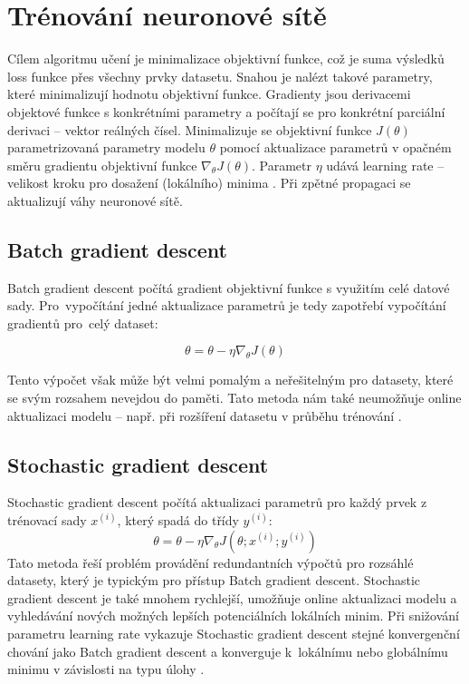 \section{Trénování neuronové sítě}
Cílem algoritmu učení je minimalizace objektivní funkce, což je suma výsledků loss funkce přes všechny prvky datasetu. Snahou je nalézt takové parametry, které minimalizují hodnotu objektivní funkce. Gradienty jsou derivacemi objektové funkce s konkrétními parametry a počítají se pro konkrétní parciální derivaci -- vektor reálných čísel. Minimalizuje se objektivní funkce $J(\theta)$ parametrizovaná parametry modelu $\theta$ pomocí aktualizace parametrů v opačném směru gradientu objektivní funkce $\nabla_{\theta}J(\theta)$. Parametr $\eta$ udává learning rate -- velikost kroku pro dosažení (lokálního) minima \cite{GradientDescent}. Při zpětné propagaci se aktualizují váhy neuronové sítě.

\subsection{Batch gradient descent}
Batch gradient descent počítá gradient objektivní funkce s využitím celé datové sady. Pro~vypočítání jedné aktualizace parametrů je tedy zapotřebí vypočítání gradientů pro~celý dataset: 

  \begin{equation} 
    \theta = \theta - \eta\nabla_{\theta}J(\theta)
    \end{equation} 

Tento výpočet však může být velmi pomalým a neřešitelným pro datasety, které se svým rozsahem nevejdou do paměti. Tato metoda nám také neumožňuje online aktualizaci modelu -- např. při rozšíření datasetu v průběhu trénování \cite{GradientDescent}.

\subsection{Stochastic gradient descent}
Stochastic gradient descent počítá aktualizaci parametrů pro každý prvek z trénovací sady $x^{(i)}$, který spadá do třídy $y^{(i)}$:
  \begin{equation} 
    \theta = \theta - \eta\nabla_{\theta}J(\theta;x^{(i)};y^{(i)})
    \end{equation} 
Tato metoda řeší problém provádění redundantních výpočtů pro rozsáhlé datasety, který je typickým pro přístup Batch gradient descent. Stochastic gradient descent je také mnohem rychlejší, umožňuje online aktualizaci modelu a vyhledávání nových možných lepších potenciálních lokálních minim. Při snižování parametru learning rate vykazuje Stochastic gradient descent stejné konvergenční chování jako Batch gradient descent a konverguje k~lokálnímu nebo globálnímu minimu v závislosti na typu úlohy \cite{GradientDescent}.

